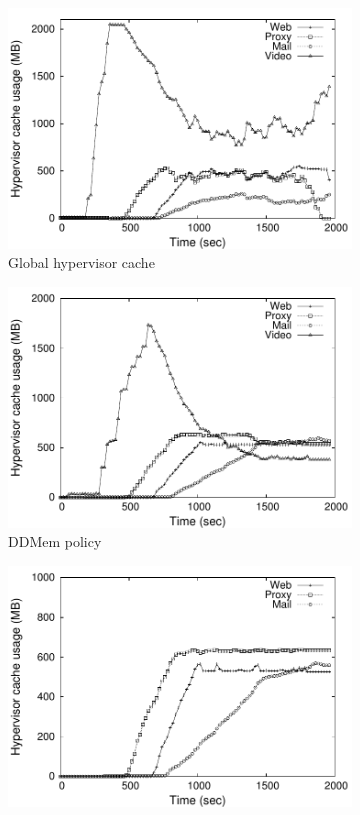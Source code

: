 \begin{figure}[t]
\centering
\begin{subfigure}{0.38\textwidth} 
\includegraphics[width=\textwidth]{data/singlevm_policy/musage_global} 
 \caption{Global hypervisor cache}
 \label{fig:gmem1} 
\end{subfigure} 
%
\begin{subfigure}{0.38\textwidth}
\includegraphics[width=\textwidth]{data/singlevm_policy/musage_dd_mem} 
 \caption{DDMem \dd{} policy}
 \label{fig:ddmem} 
\end{subfigure} 
%
\begin{subfigure}{0.38\textwidth}
\includegraphics[width=\textwidth]{data/singlevm_policy/musage_dd_hybrid} 

\end{subfigure}
\end{figure}

